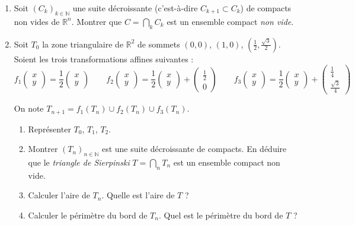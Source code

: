 \documentclass[11pt,a4paper]{article}
\newcommand{\Nn}{\mathbb{N}} \newcommand{\N}{\mathbb{N}}
\newcommand{\Rr}{\mathbb{R}} \newcommand{\R}{\mathbb{R}}
\theoremstyle{exostyle}
\newcommand{\noindication}{\stepcounter{ind}}
\begin{document}
\begin{enumerate}
	\item Soit $(C_k)_{k\in\Nn}$ une suite décroissante (c'est-à-dire $C_{k+1} \subset C_k$) de compacts non vides de $\Rr^n$. 
	Montrer que $C = \bigcap_k C_k$ est un ensemble compact \emph{non vide}.

	\item Soit $T_0$ la zone triangulaire de $\Rr^2$ de sommets $(0,0)$, $(1,0)$, $(\frac12,\frac{\sqrt3}{2})$. Soient les trois transformations affines suivantes :
	$$f_1 \begin{pmatrix}x \\ y \end{pmatrix} = \frac12 \begin{pmatrix}x \\ y \end{pmatrix} \qquad
	f_2\begin{pmatrix}x \\ y \end{pmatrix} = \frac12 \begin{pmatrix}x \\ y \end{pmatrix}+ \begin{pmatrix} \frac12 \\ 0 \end{pmatrix} \qquad
	f_3\begin{pmatrix}x \\ y \end{pmatrix} = \frac12 \begin{pmatrix}x \\ y \end{pmatrix}+ \begin{pmatrix}\frac14 \\ \frac{\sqrt3}{4} \end{pmatrix}
	$$

	On note $T_{n+1} = f_1(T_n) \cup f_2(T_n) \cup f_3(T_n)$.
	\begin{enumerate}
		\item Représenter $T_0$, $T_1$, $T_2$.
		\item Montrer $(T_n)_{n\in\Nn}$ est une suite décroissante de compacts. En déduire que le \emph{triangle de Sierpinski} $T = \bigcap_n T_n$ est un ensemble compact non vide.
		\item Calculer l'aire de $T_n$. Quelle est l'aire de $T$ ?
		\item Calculer le périmètre du bord de $T_n$. Quel est le périmètre du bord de $T$ ?		
	\end{enumerate}	
\end{enumerate}	
\finenonce
\noindication
\end{document}
